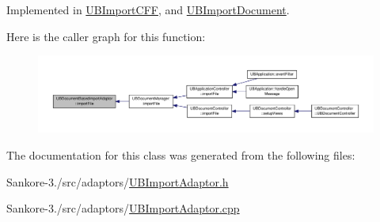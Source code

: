 Implemented in \hyperlink{class_u_b_import_c_f_f_a9130014d79eadf931ffa89af9d656a12}{U\-B\-Import\-C\-F\-F}, and \hyperlink{class_u_b_import_document_a8678037c772af1ff6e3cea1256e64c2e}{U\-B\-Import\-Document}.



Here is the caller graph for this function\-:
\nopagebreak
\begin{figure}[H]
\begin{center}
\leavevmode
\includegraphics[width=350pt]{d3/df6/class_u_b_document_based_import_adaptor_a00460b6e21115cef98ad19864ba7a345_icgraph}
\end{center}
\end{figure}




The documentation for this class was generated from the following files\-:\begin{DoxyCompactItemize}
\item 
Sankore-\/3./src/adaptors/\hyperlink{_u_b_import_adaptor_8h}{U\-B\-Import\-Adaptor.\-h}\item 
Sankore-\/3./src/adaptors/\hyperlink{_u_b_import_adaptor_8cpp}{U\-B\-Import\-Adaptor.\-cpp}\end{DoxyCompactItemize}
